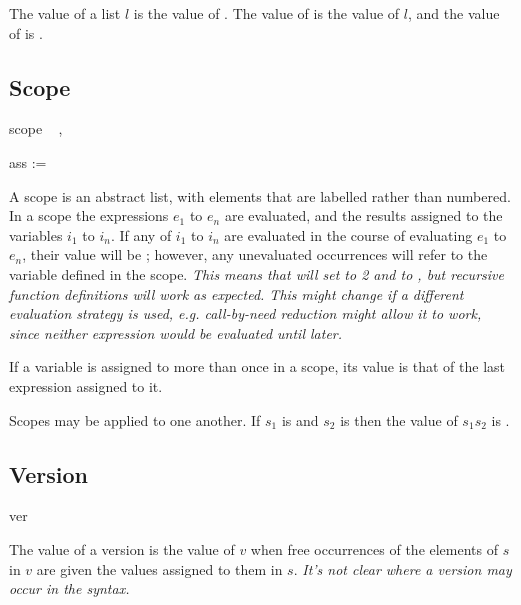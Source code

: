 \documentclass[english]{article}
\newcommand{\cont}{\noindent}
\begin{document}
\cont The value of a list $l$ is the value of . The value
of  is the value of $l$, and the value of
 is .


\subsection{Scope}

\begin{bnfc}
\item[scope]\lbraceconc\  , \closure\ \rbraceconc
\item[ass] := 
\end{bnfc}

\cont A scope is an abstract list, with elements that are labelled
rather than numbered. In a scope  the expressions $e_1$ to $e_n$
are evaluated, and the results assigned to the variables $i_1$ to
$i_n$. If any of $i_1$ to $i_n$ are evaluated in the course of
evaluating $e_1$ to $e_n$, their value will be ; however,
any unevaluated occurrences will refer to the variable defined in the
scope. \emph{This means that  will set  to 2 and  to
  , but recursive function definitions will work as
  expected. This might change if a different evaluation strategy is
  used, e.g. call-by-need reduction might allow it to work, since
  neither expression would be evaluated until later.}

If a variable is assigned to more than once in a scope, its value is
that of the last expression assigned to it.

Scopes may be applied to one another. If $s_1$ is
 and $s_2$ is
 then the value of
$s_1s_2$ is
.


\subsection{Version}

\begin{bnfc}
\item[ver] 
\end{bnfc}

The value of a version  is the value of $v$ when free
occurrences of the elements of $s$ in $v$ are given the values
assigned to them in $s$. \emph{It's not clear where a version may occur
  in the syntax.}
\end{document}

